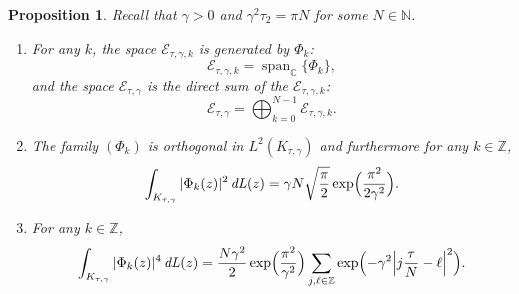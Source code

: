 \documentclass[JEP,XML,SOM,Unicode,NoFloatCountersInSection,published]{cedram}
\DeclareMathOperator{\dL}{\mathit{dL}}
\newtheorem{prop}[theorem]{Proposition}
\theoremstyle{definition}
\let\EE\exp
\newcommand\C{\mathbb C}
\newcommand\Z{\mathbb Z}
\begin{document}
\begin{prop} \label{prop72} Recall that $\gamma > 0$ and $\gamma^2 \tau_2 = \pi N$ for some $N \in \mathbb{N}$.
\begin{enumerate}
\item\label{prop72i} For any $k$, the space $\mathcal{E}_{\tau,\gamma,k}$ is generated by $\Phi_k$:
\begin{equation*}
\mathcal{E}_{\tau,\gamma,k}= \operatorname{span}_{\C} \bigl\{\Phi_{k}\bigr\},
\end{equation*}
and the space $\mathcal{E}_{\tau,\gamma}$ is the direct sum of the $\mathcal{E}_{\tau,\gamma,k}$:
\begin{equation*}
\mathcal{E}_{\tau,\gamma}=\bigoplus_{k=0}^{N-1} \mathcal{E}_{\tau,\gamma,k}.
\end{equation*}

\item\label{prop72ii} The family $(\Phi_{k})$ is orthogonal in $L^{2}(K_{\tau, \gamma})$ and furthermore for any $k \in \Z$,
\[
\int_{K_{\tau, \gamma}}|\Phi_{k}(z)|^{2} \dL(z)=\gamma N \sqrt{\frac{\pi}{ {2}}} \EE\Bigl(\frac{\pi^2}{2\gamma^2}\Bigr).
\]
\item\label{prop72iii} For any $k \in \Z$,
\begin{equation*}
\int_{K_{\tau, \gamma}} |\Phi_{k}(z)|^4 \dL(z)= \frac{N\gamma^2}2\EE\Bigl(\frac{\pi^2}{ \gamma^2}\Bigr) \sum_{j, \ell\in \Z}\EE\Bigl({-\gamma^2 \Bigl |j\frac{\tau}N-\ell \Bigr|^{2}}\Bigr).
\end{equation*}
\end{enumerate}
\end{prop}
\end{document}

